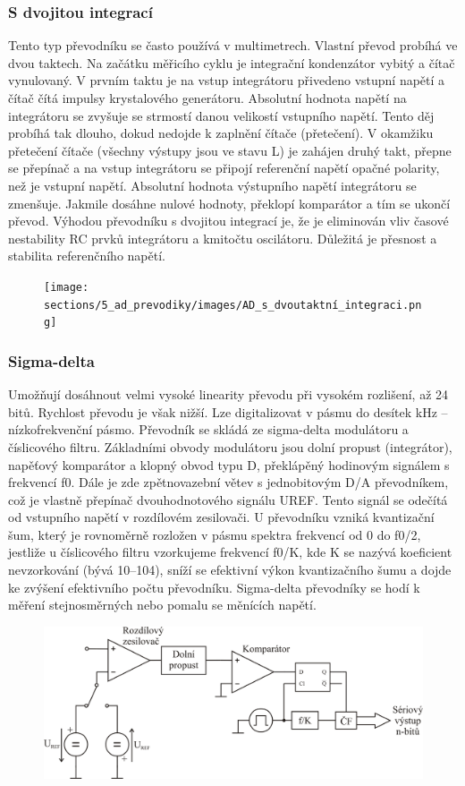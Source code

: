\subsubsection{S dvojitou integrací}
Tento typ převodníku se často používá v multimetrech. Vlastní převod probíhá ve dvou taktech. Na začátku měřicího cyklu je integrační kondenzátor vybitý a čítač vynulovaný. V prvním taktu je na vstup integrátoru přivedeno vstupní napětí a čítač čítá impulsy krystalového generátoru. Absolutní hodnota napětí na integrátoru se zvyšuje se strmostí danou velikostí vstupního napětí. Tento děj probíhá tak dlouho, dokud nedojde k zaplnění čítače (přetečení). V okamžiku přetečení čítače (všechny výstupy jsou ve stavu L) je zahájen druhý takt, přepne se přepínač a na vstup integrátoru se připojí referenční napětí opačné polarity, než je vstupní napětí. Absolutní hodnota výstupního napětí integrátoru se zmenšuje. Jakmile dosáhne nulové hodnoty, překlopí komparátor a tím se ukončí převod. Výhodou převodníku s dvojitou integrací je, že je eliminován vliv časové nestability RC prvků integrátoru a kmitočtu oscilátoru. Důležitá je přesnost a stabilita referenčního napětí.
\begin{figure}[htbp]
\centering
\texttt{[image: sections/5\_ad\_prevodiky/images/AD\_s\_dvoutaktní\_integraci.png]}
\end{figure}
\subsubsection{Sigma-delta}
Umožňují dosáhnout velmi vysoké linearity převodu při vysokém rozlišení, až 24 bitů. Rychlost převodu je však nižší. Lze digitalizovat v pásmu do desítek kHz – nízkofrekvenční pásmo. Převodník se skládá ze sigma-delta modulátoru a číslicového filtru. Základními obvody modulátoru jsou dolní propust (integrátor), napěťový komparátor a klopný obvod typu D, překlápěný hodinovým signálem s frekvencí f0. Dále je zde zpětnovazební větev s jednobitovým D/A převodníkem, což je vlastně přepínač dvouhodnotového signálu UREF. Tento signál se odečítá od vstupního napětí v rozdílovém zesilovači. U převodníku vzniká kvantizační šum, který je rovnoměrně rozložen v pásmu spektra frekvencí od 0 do f0/2, jestliže u číslicového filtru vzorkujeme frekvencí f0/K, kde K se nazývá koeficient nevzorkování (bývá 10–104), sníží se efektivní výkon kvantizačního šumu a dojde ke zvýšení efektivního počtu převodníku. Sigma-delta převodníky se hodí k měření stejnosměrných nebo pomalu se měnících napětí.
\begin{figure}[htbp]
\centering
\includegraphics[scale=0.5]{sections/5_ad_prevodiky/images/Sigma-delta_prevodnik.png}
\end{figure}
